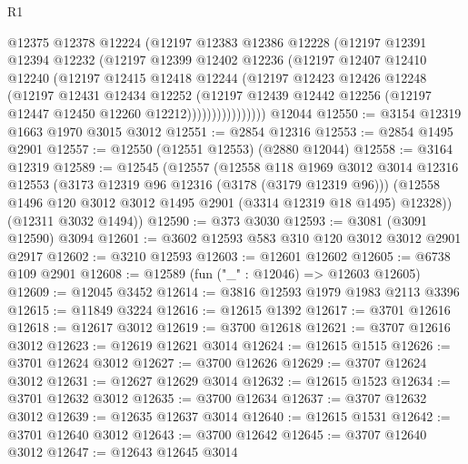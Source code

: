 \begin{lexlean}{R1}
\begin{coremodule}
                  @12375
                  @12378
                  @12224
                  (@12197
                    @12383
                    @12386
                    @12228
                    (@12197
                      @12391
                      @12394
                      @12232
                      (@12197
                        @12399
                        @12402
                        @12236
                        (@12197
                          @12407
                          @12410
                          @12240
                          (@12197
                            @12415
                            @12418
                            @12244
                            (@12197
                              @12423
                              @12426
                              @12248
                              (@12197
                                @12431
                                @12434
                                @12252
                                (@12197
                                  @12439
                                  @12442
                                  @12256
                                  (@12197 @12447 @12450 @12260 @12212))))))))))))))))
    @12044
@12550 := @3154 @12319 @1663 @1970 @3015 @3012
@12551 := @2854 @12316
@12553 := @2854 @1495 @2901
@12557 := @12550 (@12551 @12553) (@2880 @12044)
@12558 := @3164 @12319
@12589 := @12545
    (@12557
      (@12558
        @118
        @1969
        @3012
        @3014
        @12316
        @12553
        (@3173 @12319 @96 @12316 (@3178 (@3179 @12319 @96)))
        (@12558 @1496 @120 @3012 @3012 @1495 @2901 (@3314 @12319 @18 @1495) @12328))
      (@12311 @3032 @1494))
@12590 := @373 @3030
@12593 := @3081 (@3091 @12590) @3094
@12601 := @3602 @12593 @583 @310 @120 @3012 @3012 @2901 @2917
@12602 := @3210 @12593
@12603 := @12601 @12602
@12605 := @6738 @109 @2901
@12608 := @12589 (fun ("_" : @12046) => @12603 @12605)
@12609 := @12045 @3452
@12614 := @3816 @12593 @1979 @1983 @2113 @3396
@12615 := @11849 @3224
@12616 := @12615 @1392
@12617 := @3701 @12616
@12618 := @12617 @3012
@12619 := @3700 @12618
@12621 := @3707 @12616 @3012
@12623 := @12619 @12621 @3014
@12624 := @12615 @1515
@12626 := @3701 @12624 @3012
@12627 := @3700 @12626
@12629 := @3707 @12624 @3012
@12631 := @12627 @12629 @3014
@12632 := @12615 @1523
@12634 := @3701 @12632 @3012
@12635 := @3700 @12634
@12637 := @3707 @12632 @3012
@12639 := @12635 @12637 @3014
@12640 := @12615 @1531
@12642 := @3701 @12640 @3012
@12643 := @3700 @12642
@12645 := @3707 @12640 @3012
@12647 := @12643 @12645 @3014

\end{coremodule}
\end{lexlean}
